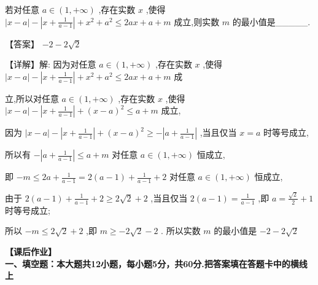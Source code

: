 \documentclass[11pt,a4paper]{article}
\begin{document}
\begin{problem} 
若对任意 \(\displaystyle a \in  \left( {1, + \infty }\right)\) ,存在实数 \(\displaystyle x\) ,使得 \(\displaystyle \left| {x - a}\right|  - \left| {x + \frac{1}{a - 1}}\right|  + {x}^{2} + {a}^{2} \leq  {2ax} + a + m\) 成立,则实数 \(\displaystyle m\) 的最小值是\_\_\_\_\_.
\begin{jiexi}
【答案】 \(\displaystyle - 2 - 2\sqrt{2}\)

【详解】解: 因为对任意 \(\displaystyle a \in  \left( {1, + \infty }\right)\) ,存在实数 \(\displaystyle x\) ,使得 \(\displaystyle \left| {x - a}\right|  - \left| {x + \frac{1}{a - 1}}\right|  + {x}^{2} + {a}^{2} \leq  {2ax} + a + m\) 成

立,所以对任意 \(\displaystyle a \in  \left( {1, + \infty }\right)\) ,存在实数 \(\displaystyle x\) ,使得 \(\displaystyle \left| {x - a}\right|  - \left| {x + \frac{1}{a - 1}}\right|  + {\left( x - a\right) }^{2} \leq  a + m\) 成立,

因为 \(\displaystyle \left| {x - a}\right|  - \left| {x + \frac{1}{a - 1}}\right|  + {\left( x - a\right) }^{2} \geq   - \left| {a + \frac{1}{a - 1}}\right|\) ,当且仅当 \(\displaystyle x = a\) 时等号成立,

所以有 \(\displaystyle - \left| {a + \frac{1}{a - 1}}\right|  \leq  a + m\) 对任意 \(\displaystyle a \in  \left( {1, + \infty }\right)\) 恒成立,

即 \(\displaystyle - m \leq  {2a} + \frac{1}{a - 1} = 2\left( {a - 1}\right)  + \frac{1}{a - 1} + 2\) 对任意 \(\displaystyle a \in  \left( {1, + \infty }\right)\) 恒成立,

由于 \(\displaystyle 2\left( {a - 1}\right)  + \frac{1}{a - 1} + 2 \geq  2\sqrt{2} + 2\) ,当且仅当 \(\displaystyle 2\left( {a - 1}\right)  = \frac{1}{a - 1}\) ,即 \(\displaystyle a = \frac{\sqrt{2}}{2} + 1\) 时等号成立;

所以 \(\displaystyle - m \leq  2\sqrt{2} + 2\) ,即 \(\displaystyle m \geq   - 2\sqrt{2} - 2\) . 所以实数 \(\displaystyle m\) 的最小值是 \(\displaystyle - 2 - 2\sqrt{2}\)

\end{jiexi}
\end{problem}

\clearpage
\textbf{【课后作业】}\\
\textbf{一、填空题：本大题共12小题，每小题5分，共60分.把答案填在答题卡中的横线上}
\end{document}
